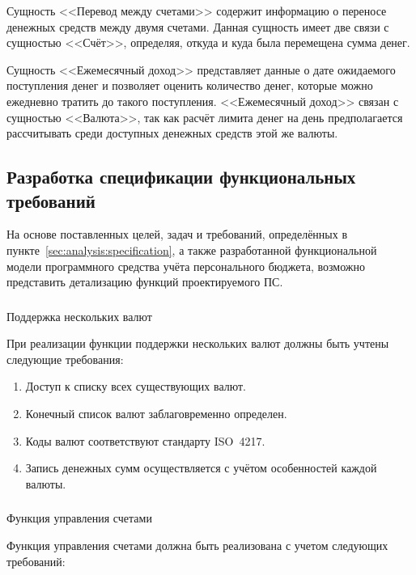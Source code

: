 Сущность <<Перевод между счетами>> содержит информацию о переносе денежных средств между двумя счетами.
Данная сущность имеет две связи с сущностью <<Счёт>>, определяя, откуда и куда была перемещена сумма денег.

Сущность <<Ежемесячный доход>> представляет данные о дате ожидаемого поступления денег и позволяет оценить количество денег, которые можно ежедневно тратить до такого поступления.
<<Ежемесячный доход>> связан с сущностью <<Валюта>>, так как расчёт лимита денег на день предполагается рассчитывать среди доступных денежных средств этой же валюты.

\subsection{Разработка спецификации функциональных требований}
\label{sec:domain:specification}

На основе поставленных целей, задач и требований, определённых в пункте~\ref{sec:analysis:specification}, а также разработанной функциональной модели программного средства учёта персонального бюджета, возможно представить детализацию функций проектируемого ПС.

\subsubsection{} Поддержка нескольких валют
\label{sec:domain:specification:currencies}

При реализации функции поддержки нескольких валют должны быть учтены следующие требования:

\begin{enumerate}
    \item Доступ к списку всех существующих валют.
    \item Конечный список валют заблаговременно определен.
    \item Коды валют соответствуют стандарту ISO~4217.
    \item Запись денежных сумм осуществляется с учётом особенностей каждой валюты.
\end{enumerate}


\subsubsection{} Функция управления счетами
\label{sec:domain:specification:wallets}

Функция управления счетами должна быть реализована с учетом следующих требований:


